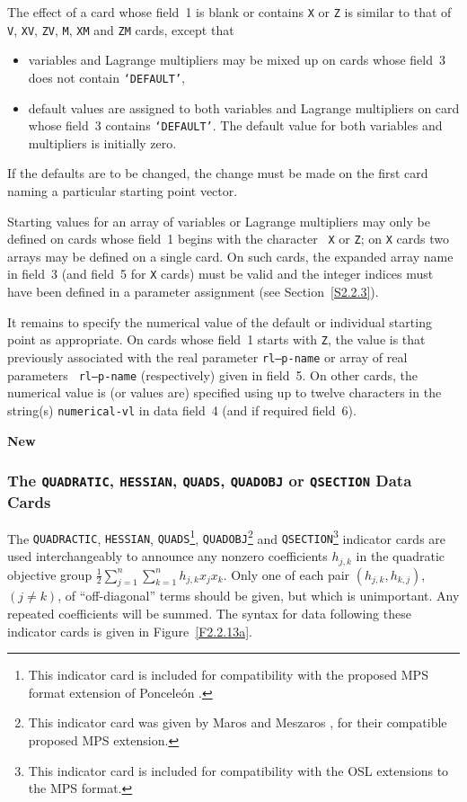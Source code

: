 \documentclass[a4paper]{article}
\newcommand{\sfrac}[2]{{\scriptstyle \frac{#1}{#2}}}
\newcommand{\half}{\sfrac{1}{2}}
\begin{document}
The effect of a card
whose field~1  is blank
or contains  {\tt X} or
{\tt Z} is similar to that of {\tt  V}, {\tt  XV}, {\tt  ZV}, {\tt M},
{\tt XM} and {\tt ZM} cards, except that
\begin{itemize}
\item
variables and Lagrange multipliers  may be mixed up  on   cards  whose
field~3 does not contain {\tt `DEFAULT'},
\item
default values
are assigned to both variables and Lagrange multipliers on card
whose field~3 contains {\tt `DEFAULT'}.  The default value for
both variables and multipliers is initially zero.
\end{itemize}

If  the defaults
are  to be  changed, the change  must be  made on the
first card naming a particular starting point vector.

Starting values for an array
of  variables or Lagrange multipliers may
only be defined on cards whose field~1 begins with  the character {\tt
X} or {\tt Z}; on {\tt X} cards two arrays may be  defined on a single
card.  On such cards, the expanded array  name
in field~3 (and field~5
for {\tt  X} cards)
must be  valid  and the integer indices  must have
been defined in a parameter assignment (see Section~\ref{S2.2.3}).

It remains to specify the numerical value of the default or individual
starting point  as appropriate.
On cards   whose field~1  starts with
{\tt  Z},  the value  is that   previously  associated  with the  real
parameter
{\tt rl--p-name}  or   array
of real  parameters  {\tt
rl--p-name} (respectively)  given in field~5.   On other cards, the
numerical value   is  (or values  are) specified using  up   to twelve
characters  in the string(s)  {\tt numerical-vl} in data field~4 (and
if required field~6).

{\bf New}
\subsubsection{\label{S2.2.13a}The
{\tt QUADRATIC}, {\tt HESSIAN}, {\tt QUADS}, {\tt QUADOBJ} or {\tt QSECTION}
 Data Cards}

The {\tt QUADRACTIC}, {\tt HESSIAN},
{\tt QUADS}\footnote{This indicator card is included for compatibility with the
proposed MPS format extension of Poncele\'{o}n \cite{Ponc:1990}.},
{\tt QUADOBJ}\footnote{This indicator card was given by Maros and Meszaros \cite{MaroMesa:1999},
for their compatible proposed MPS extension.}
and
{\tt QSECTION}\footnote{This indicator card is included for compatibility
with the OSL \cite{OSLQP:1998} extensions to the MPS format.}
indicator  cards are used interchangeably
to announce any nonzero coefficients ${h_{j,k}}$ in the quadratic
objective group ${\half \sum_{j=1}^n \sum_{k=1}^n h_{j,k} x_j x_k }$.
Only one of each pair ${(h_{j,k}, h_{k,j})}$, ${(j \neq k)}$,
of ``off-diagonal'' terms should be given,
but which is unimportant. Any repeated coefficients will be summed.
The  syntax  for  data  following   these indicator cards
is  given in Figure~\ref{F2.2.13a}.
\end{document}
